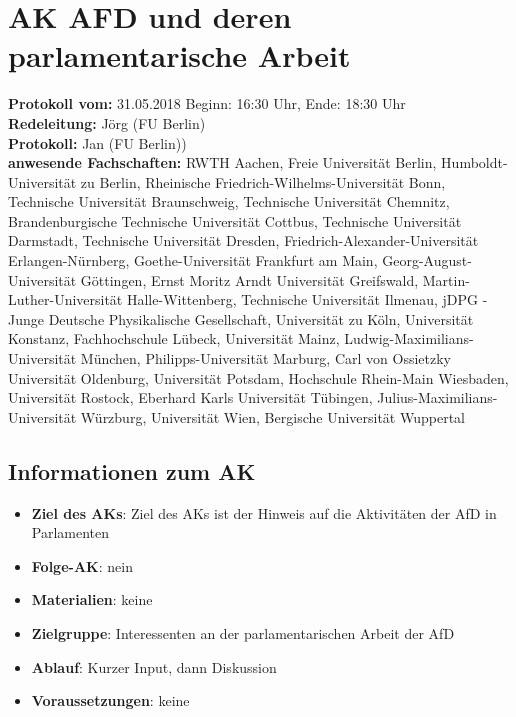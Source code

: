 
\section{AK AFD und deren parlamentarische Arbeit}

  \textbf{Protokoll vom:} 31.05.2018
  Beginn: 16:30 Uhr,
  Ende: 18:30 Uhr \\
  \textbf{Redeleitung:} Jörg (FU Berlin) \\
  \textbf{Protokoll:} Jan (FU Berlin)) \\
  \textbf{anwesende Fachschaften:} RWTH Aachen, Freie Universität Berlin, Humboldt-Universität zu Berlin, Rheinische Friedrich-Wilhelms-Universität Bonn, Technische Universität Braunschweig, Technische Universität Chemnitz, Brandenburgische Technische Universität Cottbus, Technische Universität Darmstadt, Technische Universität Dresden, Friedrich-Alexander-Universität Erlangen-Nürnberg, Goethe-Universität Frankfurt am Main, Georg-August-Universität Göttingen, Ernst Moritz Arndt Universität Greifswald, Martin-Luther-Universität Halle-Wittenberg, Technische Universität Ilmenau, jDPG - Junge Deutsche Physikalische Gesellschaft, Universität zu Köln, Universität Konstanz, Fachhochschule Lübeck, Universität Mainz, Ludwig-Maximilians-Universität München, Philipps-Universität Marburg, Carl von Ossietzky Universität Oldenburg, Universität Potsdam, Hochschule Rhein-Main Wiesbaden, Universität Rostock, Eberhard Karls Universität Tübingen, Julius-Maximilians-Universität Würzburg, Universität Wien, Bergische Universität Wuppertal
  \subsection*{Informationen zum AK}
    \begin{itemize}
    	\item \textbf{Ziel des AKs}: Ziel des AKs ist der Hinweis auf die Aktivitäten der AfD in Parlamenten
    	\item \textbf{Folge-AK}: nein
      \item \textbf{Materialien}: keine
    	\item \textbf{Zielgruppe}: Interessenten an der parlamentarischen Arbeit der AfD
    	\item \textbf{Ablauf}: Kurzer Input, dann Diskussion
    	\item \textbf{Voraussetzungen}: keine
    \end{itemize}

